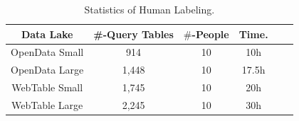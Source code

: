 \begin{table}[t]
	\centering
	\caption{Statistics of Human Labeling.}
	\begin{tabular}{|c|c|c|c|c|c|}
		\hline
		\centering
		Data Lake  & \#-Query Tables & $\#$-People & Time.   \\
		\hline  
		OpenData Small& 914  & 10 & 10h   \\
		\hline
		OpenData Large& 1,448  & 10  &  17.5h   \\
		\hline
		WebTable Small& 1,745   & 10 &  20h  \\
		\hline
		WebTable Large& 2,245  & 10 &  30h  \\
		\hline
	\end{tabular}
	\label{Table:humanLabeling}
	
\end{table}